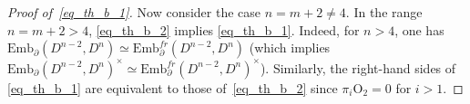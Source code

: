 \documentclass[11pt]{amsart}
\theoremstyle{definition}
\newcommand{\Ebar}{\overline{\mathrm{Emb}}}
\newcommand{\Emb}{\mathrm{Emb}}
\newcommand{\pdEmb}{\mathrm{pdEmb}}
\newcommand{\PL}{\mathrm{PL}}
\newcommand{\TOP}{\mathrm{TOP}}
\newcommand{\OO}{\mathrm{O}}
\newcommand{\PD}{\mathrm{PD}}
\newcommand{\mmod}{\,\mathrm{mod}\,}
\newcommand{\bbslash}{\backslash\!\!\backslash}
\numberwithin{equation}{section}
\begin{document}
\begin{proof}[Proof of~\eqref{eq_th_b_1}]
Now consider the case $n=m+2\neq 4$.  
In the range $n=m+2>4$,  \eqref{eq_th_b_2} implies \eqref{eq_th_b_1}. Indeed, for $n>4$, one has $\Emb_\partial(D^{n-2},D^n)\simeq
\Emb_\partial^{fr}(D^{n-2},D^n)$ (which implies $\Emb_\partial(D^{n-2},D^n)^\times\simeq
\Emb_\partial^{fr}(D^{n-2},D^n)^\times$). Similarly, the right-hand sides of \eqref{eq_th_b_1} are equivalent to those of~\eqref{eq_th_b_2} since $\pi_i \OO_2=0$ for $i>1$.


\end{proof}
\end{document}

